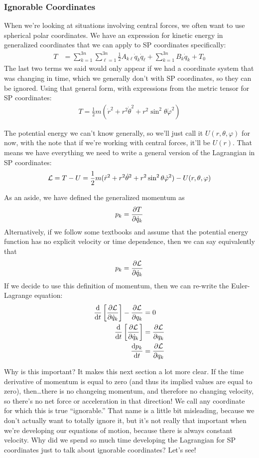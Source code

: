 \documentclass[a4paper]{article}
\begin{document}
\subsubsection{Ignorable Coordinates}
When we're looking at situations involving central forces, we often want to
use spherical polar coordinates. We have an expression for kinetic energy in
generalized coordinates that we can apply to SP coordinates specifically:
\begin{align*}
	T &= \sum_{k=1}^{3n}\sum_{\ell=1}^{3n}\frac{1}{2}A_{k\ell}
		\dot{q}_k\dot{q}_\ell +
		\sum_{k=1}^{3n}B_k\dot{q}_k+T_0
\end{align*}
The last two terms we said would only appear if we had a coordinate system that
was changing in time, which we generally don't with SP coordinates, so they can
be ignored. Using that general form, with expressions from the metric tensor
for SP coordinates:
\begin{align*}
	T = \frac{1}{2}m(\dot{r}^2 + r^2\dot{\theta}^2 +
		r^2\sin^2\theta\dot{\varphi}^2)
\end{align*}

The potential energy we can't know generally, so we'll just call it
$U(r,\theta,\varphi)$ for now, with the note that if we're working with
central forces, it'll be $U(r)$. That means we have everything we need to
write a general version of the Lagrangian in SP coordinates:
\[
	\mathcal{L} = T-U
	= \frac{1}{2}m(\dot{r}^2 + r^2\dot{\theta}^2 +
	r^2\sin^2\theta\dot{\varphi}^2) - U(r,\theta,\varphi)
\]

As an aside, we have defined the generalized momentum as
\[ p_k = \frac{\partial T}{\partial \dot{q}_k} \]
Alternatively, if we follow some textbooks and assume that the potential energy
function has no explicit velocity or time dependence, then we can say
equivalently that
\[ p_k = \frac{\partial \mathcal{L}}{\partial \dot{q}_k} \]
If we decide to use this definition of momentum, then we can re-write the
Euler-Lagrange equation:
\begin{align*}
	\frac{\mathrm{d}}{\mathrm{d} t}\left[\frac{\partial \mathcal{L}}{\partial \dot{q}_k}\right]-\frac{\partial \mathcal{L}}{\partial q_k} &=0\\
	\frac{\mathrm{d}}{\mathrm{d} t}\left[\frac{\partial \mathcal{L}}{\partial \dot{q}_k}\right]&=\frac{\partial \mathcal{L}}{\partial q_k}\\
	\frac{\mathrm{d} p_k}{\mathrm{d} t} &= \frac{\partial \mathcal{L}}{\partial q_k}
\end{align*}

Why is this important? It makes this next section a lot more clear. If
the time derivative of momentum is equal to zero (and thus its implied values
are equal to zero), then\ldots there is no changeing momentum, and therefore
no changing velocity, so there's no net force or acceleration in that
direction! We call any coordinate for which this is true ``ignorable.''
That name is a little bit misleading, because we don't actually want to totally
ignore it, but it's not really that important when we're developing our
equations of motion, because there is always constant velocity. Why did we
spend so much time developing the Lagrangian for SP coordinates just to talk
about ignorable coordinates? Let's see!
\end{document}
